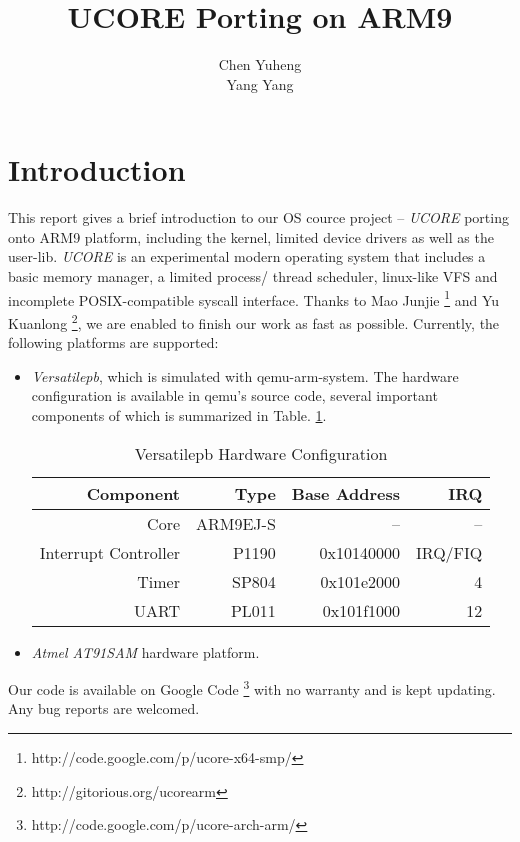 \documentclass[a4paper]{article}
\begin{document}
\title{UCORE Porting on ARM9}
\author{Chen Yuheng \\ Yang Yang}
\maketitle

\section{Introduction}
This report gives a brief introduction to our OS cource project -- 
\emph{UCORE} porting onto ARM9 platform, including the kernel, limited
device drivers as well as the user-lib. \emph{UCORE} is an experimental 
modern operating system that includes a basic memory manager, a limited process/
thread scheduler, linux-like VFS and incomplete POSIX-compatible syscall 
interface. Thanks to Mao Junjie
\footnote{http://code.google.com/p/ucore-x64-smp/} and Yu Kuanlong
\footnote{http://gitorious.org/ucorearm}, we are enabled to finish our
 work as fast as possible. Currently, the following platforms are supported:
 \begin{itemize}
   \item \emph{Versatilepb}, which is simulated with qemu-arm-system.
     The hardware configuration is available in qemu's source code,
     several important components of which is summarized in
     Table. \ref{tab:versatile1}.
     \begin{table}[h]
       \centering
       \begin{tabular}{|r|rrr|}
         \hline
         Component & Type & Base Address &  IRQ \\
         \hline
         Core     &  ARM9EJ-S & -- & -- \\
         Interrupt Controller & P1190 & 0x10140000 & IRQ/FIQ \\
         Timer    &  SP804    & 0x101e2000 & 4 \\
         UART     &  PL011  & 0x101f1000 & 12  \\
         \hline
       \end{tabular}
       \caption{Versatilepb Hardware Configuration}
       \label{tab:versatile1}
     \end{table}

   \item \emph{Atmel AT91SAM} hardware platform.
 \end{itemize}

Our code is available on Google Code
\footnote{http://code.google.com/p/ucore-arch-arm/} with no warranty and
is kept updating. Any bug reports are welcomed.
\end{document}
